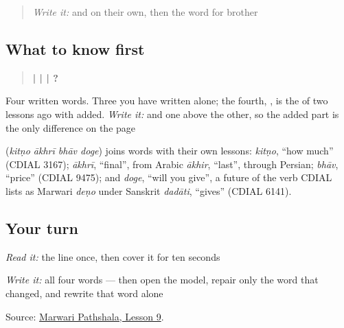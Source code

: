 \label{lesson:MW-C24-final-price}



\begin{quote}
\emph{Write it:} \textbf{} and \textbf{} on their own, then the word for brother
\end{quote}

\subsection*{What to know first}
\begin{quote}
\textbf{ |  |  | ?}
\end{quote}

Four written words. Three you have written alone; the fourth, \textbf{}, is the \textbf{} of two lessons ago with \textbf{} added. \emph{Write it:} \textbf{} and \textbf{} one above the other, so the added part is the only difference on the page

\begin{cousinweb}
\textbf{   } (\emph{kitṇo ākhrī bhāv doge}) joins words with their own lessons: \emph{kitṇo}, \textquotedblleft{}how much\textquotedblright{} (CDIAL 3167); \emph{ākhrī}, \textquotedblleft{}final\textquotedblright{}, from Arabic \emph{ākhir}, \textquotedblleft{}last\textquotedblright{}, through Persian; \emph{bhāv}, \textquotedblleft{}price\textquotedblright{} (CDIAL 9475); and \emph{doge}, \textquotedblleft{}will you give\textquotedblright{}, a future of the verb CDIAL lists as Marwari \emph{deṇo} under Sanskrit \emph{dadāti}, \textquotedblleft{}gives\textquotedblright{} (CDIAL 6141).
\end{cousinweb}

\subsection*{Your turn}
\emph{Read it:} the line once, then cover it for ten seconds

\emph{Write it:} all four words — then open the model, repair only the word that changed, and rewrite that word alone

\begin{tcolorbox}[breakable,colback=teal!4,colframe=teal!35!black,title={Before you move on}]
Source: \href{https://www.marwaripathshala.com/marwari-lesson-9-english}{Marwari Pathshala, Lesson 9}.
\end{tcolorbox}
